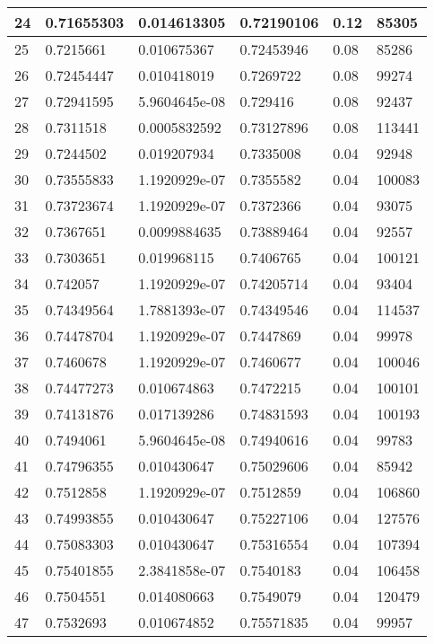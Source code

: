 \begin{longtable}{|l|l|l|l|l|l|}
24 & 0.71655303 & 0.014613305 & 0.72190106 & 0.12 & 85305 \\ \hline 
25 & 0.7215661 & 0.010675367 & 0.72453946 & 0.08 & 85286 \\ \hline 
26 & 0.72454447 & 0.010418019 & 0.7269722 & 0.08 & 99274 \\ \hline 
27 & 0.72941595 & 5.9604645e-08 & 0.729416 & 0.08 & 92437 \\ \hline 
28 & 0.7311518 & 0.0005832592 & 0.73127896 & 0.08 & 113441 \\ \hline 
29 & 0.7244502 & 0.019207934 & 0.7335008 & 0.04 & 92948 \\ \hline 
30 & 0.73555833 & 1.1920929e-07 & 0.7355582 & 0.04 & 100083 \\ \hline 
31 & 0.73723674 & 1.1920929e-07 & 0.7372366 & 0.04 & 93075 \\ \hline 
32 & 0.7367651 & 0.0099884635 & 0.73889464 & 0.04 & 92557 \\ \hline 
33 & 0.7303651 & 0.019968115 & 0.7406765 & 0.04 & 100121 \\ \hline 
34 & 0.742057 & 1.1920929e-07 & 0.74205714 & 0.04 & 93404 \\ \hline 
35 & 0.74349564 & 1.7881393e-07 & 0.74349546 & 0.04 & 114537 \\ \hline 
36 & 0.74478704 & 1.1920929e-07 & 0.7447869 & 0.04 & 99978 \\ \hline 
37 & 0.7460678 & 1.1920929e-07 & 0.7460677 & 0.04 & 100046 \\ \hline 
38 & 0.74477273 & 0.010674863 & 0.7472215 & 0.04 & 100101 \\ \hline 
39 & 0.74131876 & 0.017139286 & 0.74831593 & 0.04 & 100193 \\ \hline 
40 & 0.7494061 & 5.9604645e-08 & 0.74940616 & 0.04 & 99783 \\ \hline 
41 & 0.74796355 & 0.010430647 & 0.75029606 & 0.04 & 85942 \\ \hline 
42 & 0.7512858 & 1.1920929e-07 & 0.7512859 & 0.04 & 106860 \\ \hline 
43 & 0.74993855 & 0.010430647 & 0.75227106 & 0.04 & 127576 \\ \hline 
44 & 0.75083303 & 0.010430647 & 0.75316554 & 0.04 & 107394 \\ \hline 
45 & 0.75401855 & 2.3841858e-07 & 0.7540183 & 0.04 & 106458 \\ \hline 
46 & 0.7504551 & 0.014080663 & 0.7549079 & 0.04 & 120479 \\ \hline 
47 & 0.7532693 & 0.010674852 & 0.75571835 & 0.04 & 99957 \\ \hline 

\end{longtable}
